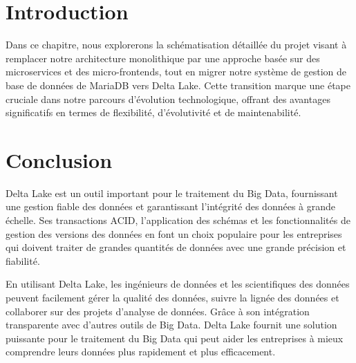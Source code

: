 \section*{Introduction}

Dans ce chapitre, nous explorerons la schématisation détaillée du projet visant à remplacer notre architecture monolithique par une approche basée sur des microservices et des micro-frontends, tout en migrer notre système de gestion de base de données de MariaDB vers Delta Lake. Cette transition marque une étape cruciale dans notre parcours d'évolution technologique, offrant des avantages significatifs en termes de flexibilité, d'évolutivité et de maintenabilité.


\section*{Conclusion}

Delta Lake est un outil important pour le traitement du Big Data, fournissant une gestion fiable des données et garantissant l'intégrité des données à grande échelle. Ses transactions ACID, l'application des schémas et les fonctionnalités de gestion des versions des données en font un choix populaire pour les entreprises qui doivent traiter de grandes quantités de données avec une grande précision et fiabilité.

En utilisant Delta Lake, les ingénieurs de données et les scientifiques des données peuvent facilement gérer la qualité des données, suivre la lignée des données et collaborer sur des projets d'analyse de données. Grâce à son intégration transparente avec d'autres outils de Big Data. Delta Lake fournit une solution puissante pour le traitement du Big Data qui peut aider les entreprises à mieux comprendre leurs données plus rapidement et plus efficacement.